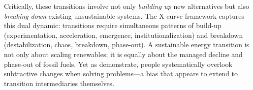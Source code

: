 \documentclass[../main.tex]{subfiles}
\begin{document}
Critically, these transitions involve not only \emph{building up} new alternatives but also \emph{breaking down} existing unsustainable systems. The X-curve framework  captures this dual dynamic: transitions require simultaneous patterns of build-up (experimentation, acceleration, emergence, institutionalization) and breakdown (destabilization, chaos, breakdown, phase-out). A sustainable energy transition is not only about scaling renewables; it is equally about the managed decline and phase-out of fossil fuels. Yet as \textcite{adams2021subtractive} demonstrate, people systematically overlook subtractive changes when solving problems---a bias that appears to extend to transition intermediaries themselves.
\end{document}
